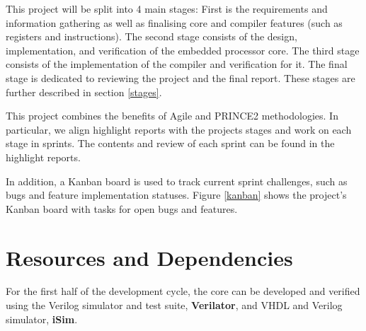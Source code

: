 \documentclass[11pt,a4paper]{report}
\begin{document}
This project will be split into 4 main stages: First is the requirements and information gathering as well as finalising core and compiler features (such as registers and instructions). The second stage consists of the design, implementation, and verification  of the embedded processor core. The third stage consists of the implementation of the compiler and verification for it. The final stage is dedicated to reviewing the project and the final report. These stages are  further described in section \ref{stages}.

This project combines the benefits of Agile and PRINCE2 methodologies. In particular, we align highlight reports with the projects stages and work on each stage in sprints. The contents and review of each sprint can be found in the highlight reports.

In addition, a Kanban board is used to track current sprint challenges, such as bugs and feature implementation statuses. Figure \ref{kanban} shows the project's Kanban board with tasks for open bugs and features.



\section{Resources and Dependencies}
For the first half of the development cycle, the core can be developed and verified using the Verilog simulator and test suite, \textbf{Verilator}, and VHDL and Verilog simulator, \textbf{iSim}.
\end{document}
